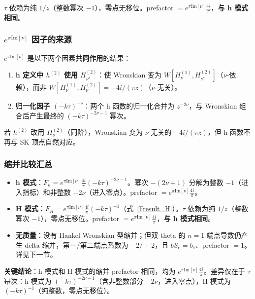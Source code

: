 ﻿\documentclass[a4paper,11pt]{article}
\begin{document}
$\tau$ 依赖为纯 $1/z$（整数幂次 $-1$），零点无移位。prefactor $= e^{\pi\text{Im}[\nu]} \frac{4i}{\pi}$，\textbf{与 h 模式相同}。

\subsubsection{$e^{\pi\text{Im}[\nu]}$ 因子的来源}

$e^{\pi\text{Im}[\nu]}$ 是以下两个因素\textbf{共同作用}的结果：

\begin{enumerate}
  \item \textbf{h 定义中 $h^{(2)}$ 使用 $H_{\nu^*}^{(2)}$}：使 Wronskian 变为 $W[H_\nu^{(1)}, H_{\nu^*}^{(2)}]$（$\nu$-依赖），而非 $W[H_\nu^{(1)}, H_\nu^{(2)}] = -4i/(\pi z)$（$\nu$-无关）。
  \item \textbf{归一化因子 $(-k\tau)^{-\nu}$}：两个 h 函数的归一化合并为 $z^{-2\nu}$，与 Wronskian 组合后产生最终的 $(-k\tau)^{-2\nu-1}$ 幂次。
\end{enumerate}

若 $h^{(2)}$ 改用 $H_\nu^{(2)}$（同阶），Wronskian 变为 $\nu$-无关的 $-4i/(\pi z)$，但 h 函数不再与 SK 顶点自然对应。

\subsubsection{缩并比较汇总}

\begin{itemize}
  \item \textbf{h 模式}：$F_h = e^{\pi\text{Im}[\nu]} \frac{4i}{\pi} (-k\tau)^{-2\nu-1}$。幂次 $-(2\nu+1)$ 分解为整数 $-1$（进入指标）和非整数 $-2\nu$（进入零点）。prefactor $= e^{\pi\text{Im}[\nu]} \frac{4i}{\pi}$。
  \item \textbf{H 模式}：$F_H = e^{\pi\text{Im}[\nu]} \frac{4i}{\pi} (-k\tau)^{-1}$（式~\eqref{Fresult_H}）。$\tau$ 依赖为纯 $1/z$（整数幂次 $-1$），零点无移位。prefactor $= e^{\pi\text{Im}[\nu]} \frac{4i}{\pi}$，\textbf{与 h 模式相同}。
  \item \textbf{无质量}：没有 Hankel Wronskian 型缩并；但双 theta 的 $n=1$ 端点导数仍产生 delta 缩并，第一/第二端点系数为 $-2/+2$，且 $bS_e=b_e$、prefactor $=1$。详见下一节。
\end{itemize}

\textbf{关键结论}：h 模式和 H 模式的缩并 prefactor 相同，均为 $e^{\pi\text{Im}[\nu]} \frac{4i}{\pi}$。差异仅在于 $\tau$ 幂次：h 模式为 $(-k\tau)^{-2\nu-1}$（含非整数部分 $-2\nu$，进入零点），H 模式为 $(-k\tau)^{-1}$（纯整数，零点无移位）。
\end{document}
